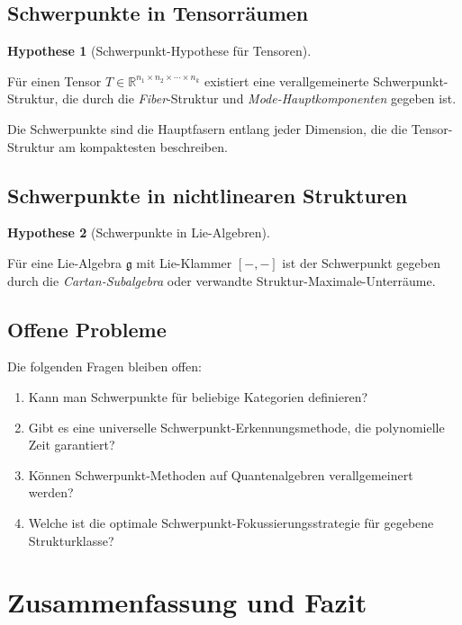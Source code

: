 \documentclass[a4paper,12pt]{article}
\theoremstyle{definition}
\newtheorem{hypothesis}{Hypothese}
\begin{document}
\subsection{Schwerpunkte in Tensorräumen}

\begin{hypothesis}[Schwerpunkt-Hypothese für Tensoren]
\label{hyp:tensor_schwerpunkte}

Für einen Tensor $T \in \mathbb{R}^{n_1 \times n_2 \times \cdots \times n_k}$ existiert eine verallgemeinerte Schwerpunkt-Struktur, die durch die \emph{Fiber}-Struktur und \emph{Mode-Hauptkomponenten} gegeben ist.

Die Schwerpunkte sind die Hauptfasern entlang jeder Dimension, die die Tensor-Struktur am kompaktesten beschreiben.
\end{hypothesis}

\subsection{Schwerpunkte in nichtlinearen Strukturen}

\begin{hypothesis}[Schwerpunkte in Lie-Algebren]
\label{hyp:lie_schwerpunkte}

Für eine Lie-Algebra $\mathfrak{g}$ mit Lie-Klammer $[-, -]$ ist der Schwerpunkt gegeben durch die \emph{Cartan-Subalgebra} oder verwandte Struktur-Maximale-Unterräume.
\end{hypothesis}

\subsection{Offene Probleme}

Die folgenden Fragen bleiben offen:

\begin{enumerate}
\item Kann man Schwerpunkte für beliebige Kategorien definieren?
\item Gibt es eine universelle Schwerpunkt-Erkennungsmethode, die polynomielle Zeit garantiert?
\item Können Schwerpunkt-Methoden auf Quantenalgebren verallgemeinert werden?
\item Welche ist die optimale Schwerpunkt-Fokussierungsstrategie für gegebene Strukturklasse?
\end{enumerate}

\section{Zusammenfassung und Fazit}
\end{document}
